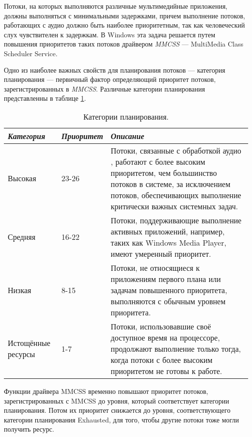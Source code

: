 Потоки, на которых выполняются различные мультимедийные приложения, должны выполняться с минимальными задержками, причем выполнение потоков, работающих с аудио должно быть наиболее приоритетным, так как человеческий слух чувствителен к задержкам. В Windows эта задача решается путем повышения приоритетов таких потоков драйвером \textit{MMCSS} --- MultiMedia Class Scheduler Service.

Одно из наиболее важных свойств для планирования потоков --- категория планирования --- первичный фактор определяющий приоритет потоков, зарегистрированных в \textit{MMCSS}. Различные категории планирования представленны в таблице \ref{tab:plan}.

\begin{table}[h]
	\caption{Категории планирования.}
	\begin{center}
		\begin{tabular}{|p{42mm}|p{28mm}|p{83mm}|}
			\hline
			\textit{Категория} & \textit{Приоритет} & \textit{Описание} \\
			\hline
			Высокая & 23-26 & Потоки, связанные с обработкой аудио , работают с более высоким приоритетом, чем большинство потоков в системе, за исключением потоков, обеспечивающих выполнение критически важных системных задач. \\
			\hline
			Средняя & 16-22 & Потоки, поддерживающие выполнение активных приложений, например, таких как Windows Media Player, имеют умеренный приоритет. \\
			\hline
			Низкая & 8-15 & Потоки, не относящиеся к приложениям первого плана или задачам повышенного приоритета, выполняются с обычным уровнем приоритета. \\
			\hline
			Истощённые ресурсы & 1-7 & Потоки, использовавшие своё доступное время на процессоре, продолжают выполнение только тогда, когда потоки с более высоким приоритетом не готовы к работе. \\
			\hline
		\end{tabular}
	\end{center}
	\label{tab:plan}
\end{table}


Функции драйвера MMCSS временно повышают приоритет потоков, зарегистрированных с
MMCSS до уровня, который соответствует категории планирования. Потом их приоритет снижается до уровня, соответствующего категории планирования Exhausted, для
того, чтобы другие потоки тоже могли получить ресурс.
